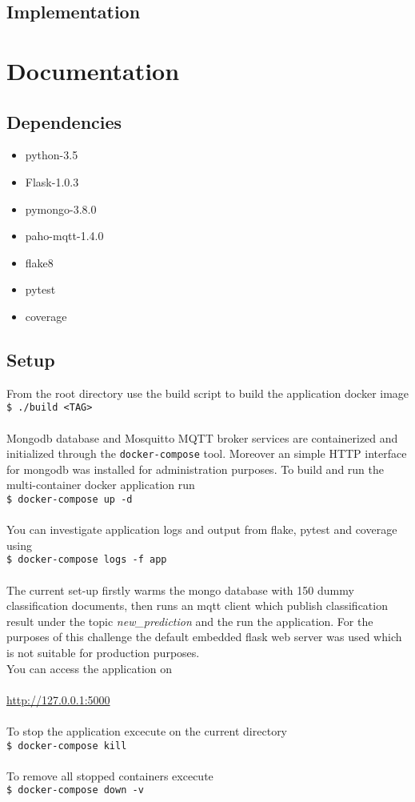\documentclass[a4paper,10pt]{article}
\newcommand{\shellcmd}[1]{\\\indent\indent\texttt{\footnotesize\$ #1}\\}
\begin{document}
\subsection{Implementation}
\section{Documentation}

\subsection{Dependencies}
\begin{itemize}
 \item python-3.5
 \item Flask-1.0.3
 \item pymongo-3.8.0
 \item paho-mqtt-1.4.0
 \item flake8
 \item pytest
 \item coverage
\end{itemize}

\subsection{Setup}
From the root directory use the build script to build the application docker image
\shellcmd{./build <TAG>}
\\
Mongodb database and Mosquitto MQTT broker services are containerized and initialized through the
\texttt{docker-compose} tool. Moreover an simple HTTP interface for mongodb was installed
for administration purposes. To build and run the multi-container docker application run
\shellcmd{docker-compose up -d}
\\
You can investigate application logs and output from flake, pytest and coverage using
\shellcmd{docker-compose logs -f app}
\\
The current set-up firstly warms the mongo database with 150 dummy classification documents,
then runs an mqtt client which publish classification result under the topic \emph{new\_prediction}
and the run the application. For the purposes of this challenge the default embedded flask web server
was used which is not suitable for production purposes.
\\
You can access the application on \\
\\
\hspace*{50pt}\url{http://127.0.0.1:5000}\\
\\
To stop the application excecute on the current directory
\shellcmd{docker-compose kill}
\\
To remove all stopped containers excecute
\shellcmd{docker-compose down -v}
\end{document}
